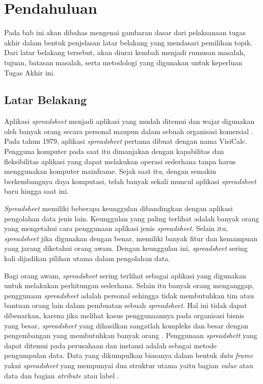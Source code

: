\chapter{Pendahuluan}

Pada bab ini akan dibahas mengenai gambaran dasar dari pelaksanaan tugas akhir dalam bentuk penjelasan latar belakang yang mendasari pemilihan topik. Dari latar belakang tersebut, akan diurai kembali menjadi rumusan masalah, tujuan, batasan masalah, serta metodologi yang digunakan untuk keperluan Tugas Akhir ini.

\section{Latar Belakang}

Aplikasi \textit{spreadsheet} menjadi aplikasi yang mudah ditemui dan wajar digunakan oleh banyak orang secara personal maupun dalam sebuah organisasi komersial \citep{Chan1996}. Pada tahun 1979, aplikasi \textit{spreadsheet} pertama dibuat dengan nama VisiCalc. Pengguna komputer pada saat itu dimanjakan dengan kapabilitas dan fleksibilitas aplikasi yang dapat melakukan operasi sederhana tanpa harus menggunakan komputer mainframe. Sejak saat itu, dengan semakin berkembangnya daya komputasi, telah banyak sekali muncul aplikasi \textit{spreadsheet} baru hingga saat ini.

\textit{Spreadsheet} memiliki beberapa keunggulan dibandingkan dengan aplikasi pengolahan data jenis lain. Keunggulan yang paling terlihat adalah banyak orang yang mengetahui cara penggunaan aplikasi jenis \textit{spreadsheet}. Selain itu, \textit{spreadsheet} jika digunakan dengan benar, memiliki banyak fitur dan kemampuan yang jarang diketahui orang awam. Dengan keunggulan ini, \textit{spreadsheet} sering kali dijadikan pilihan utama dalam pengolahan data.

Bagi orang awam, \textit{spreadsheet} sering terlihat sebagai aplikasi yang digunakan untuk melakukan perhitungan sederhana. Selain itu banyak orang menganggap, penggunaan \textit{spreadsheet} adalah personal sehingga tidak membutuhkan tim atau bantuan orang lain dalam pembuatan sebuah \textit{spreadsheet}. Hal ini tidak dapat dibenarkan, karena jika melihat kasus penggunaannya pada organisasi bisnis yang besar, \textit{spreadsheet} yang dihasilkan sangatlah kompleks dan besar dengan pengembangan yang membutuhkan banyak orang \citep{Panko1998}. Penggunaan \textit{spreadshett} yang dapat ditemui pada perusahaan dan instansi adalah sebagai metode pengumpulan data. Data yang dikumpulkan biasanya dalam bentuk \textit{data frame} yakni \textit{spreadsheet} yang mempunyai dua struktur utama yaitu bagian \textit{value} atau data dan bagian \textit{atribute} atau label \citep{Chen2013}. 

